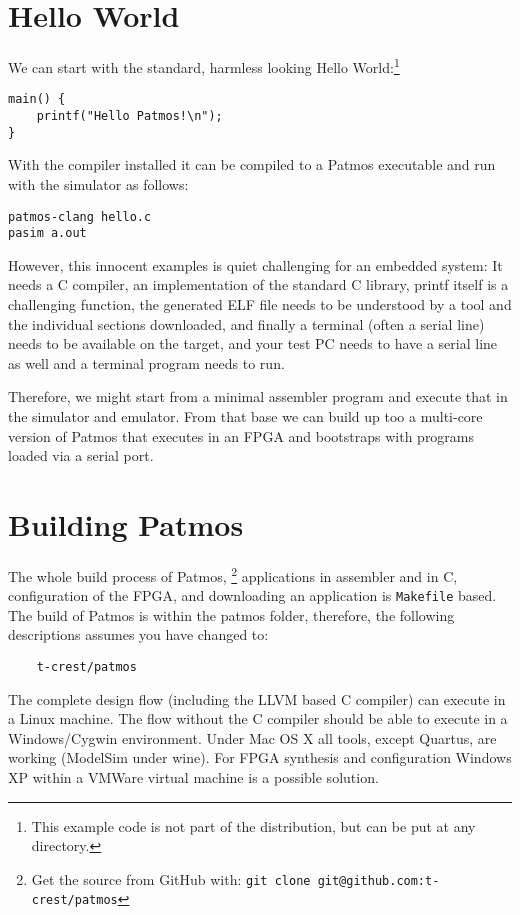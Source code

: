 \documentclass[a4paper,fontsize=10pt,twoside,DIV15,BCOR12mm,headinclude=true,footinclude=false,pagesize,bibtotoc]{scrbook}
\newcommand{\code}[1]{{\texttt{#1}}}
\begin{document}
\section{Hello World}

We can start with the standard, harmless looking Hello
World:\footnote{This example code is not part of the distribution, but
can be put at any directory.}

\begin{verbatim}
main() {
    printf("Hello Patmos!\n");
}
\end{verbatim}

With the compiler installed it can be compiled to a Patmos executable
and run with the simulator as follows:

\begin{verbatim}
patmos-clang hello.c
pasim a.out
\end{verbatim}

However, this innocent examples is quiet challenging for an embedded system:
It needs a C compiler, an implementation of the standard C library, printf
itself is a challenging function, the generated ELF file needs to be understood
by a tool and the individual sections downloaded, and finally a terminal (often
a serial line) needs to be available on the target, and your test PC needs to
have a serial line as well and a terminal program needs to run.

Therefore, we might start from a minimal assembler program and execute
that in the simulator and emulator. From that base we can build up too
a multi-core version of Patmos that executes in an FPGA and bootstraps
with programs loaded via a serial port.


\section{Building Patmos}

The whole build process of Patmos,%
\footnote{Get the source from GitHub with: \code{git clone git@github.com:t-crest/patmos}}
applications in assembler
and in C, configuration of the FPGA, and downloading an application
is \code{Makefile} based. The build of Patmos is within the patmos folder,
therefore, the following descriptions assumes you have changed to:

\begin{verbatim}
    t-crest/patmos
\end{verbatim}


The complete design flow (including the LLVM
based C compiler) can execute in a Linux machine. The flow without
the C compiler should be able to execute in a Windows/Cygwin environment.
Under Mac OS X all tools, except Quartus, are working (ModelSim under
wine). For FPGA synthesis and configuration Windows XP within a VMWare
virtual machine is a possible solution.
\end{document}

